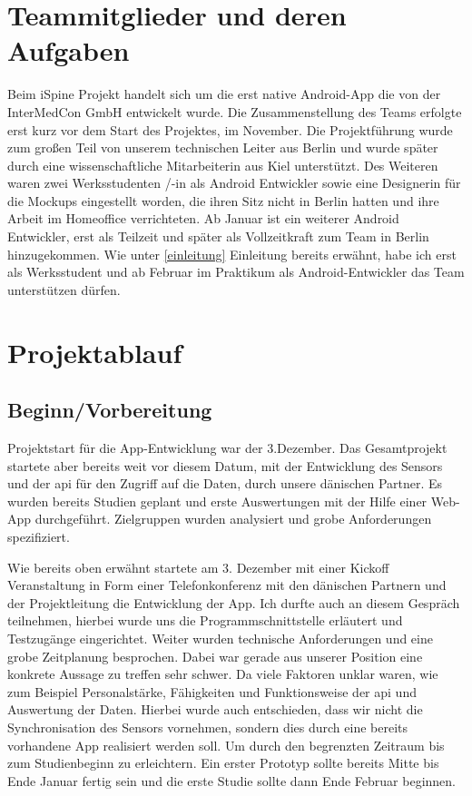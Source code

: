 \section{Teammitglieder und deren Aufgaben}\label{team}
Beim iSpine Projekt handelt sich um die erst native Android-App die von der InterMedCon GmbH entwickelt wurde. Die Zusammenstellung des Teams erfolgte erst kurz vor dem Start des Projektes, im November. Die Projektführung wurde zum großen Teil von unserem technischen Leiter aus Berlin und wurde später durch eine wissenschaftliche Mitarbeiterin aus Kiel unterstützt. Des Weiteren waren zwei Werksstudenten /-in als Android Entwickler sowie eine Designerin für die Mockups eingestellt worden, die ihren Sitz nicht in Berlin hatten und ihre Arbeit im Homeoffice verrichteten. Ab Januar ist ein weiterer Android Entwickler, erst als Teilzeit und später als Vollzeitkraft zum Team in Berlin hinzugekommen. Wie unter \ref*{einleitung} Einleitung bereits erwähnt, habe ich erst als Werksstudent und ab Februar im Praktikum als Android-Entwickler das Team unterstützen dürfen. 

\section{Projektablauf}
\subsection{Beginn/Vorbereitung}\label{kapBegin}
Projektstart für die App-Entwicklung  war der 3.Dezember. Das Gesamtprojekt startete aber bereits weit vor diesem Datum, mit der Entwicklung des Sensors und der \ac{api} für den Zugriff auf die Daten, durch unsere dänischen Partner. Es wurden bereits Studien geplant und erste Auswertungen mit der Hilfe einer Web-App durchgeführt. Zielgruppen wurden analysiert und grobe Anforderungen spezifiziert.

Wie bereits oben erwähnt startete am 3. Dezember mit einer Kickoff Veranstaltung in Form einer Telefonkonferenz mit den dänischen Partnern und der Projektleitung die Entwicklung der App. Ich durfte auch an diesem Gespräch teilnehmen, hierbei wurde uns die Programmschnittstelle erläutert und Testzugänge eingerichtet.
Weiter wurden technische Anforderungen  und eine grobe Zeitplanung besprochen. Dabei war gerade aus unserer Position eine konkrete Aussage zu treffen sehr schwer. Da viele Faktoren unklar waren, wie zum Beispiel Personalstärke, Fähigkeiten und Funktionsweise der \ac{api} und Auswertung der Daten.
Hierbei wurde auch entschieden, dass wir nicht die Synchronisation des Sensors vornehmen, sondern dies durch eine bereits vorhandene App realisiert werden soll. Um durch den begrenzten Zeitraum bis zum Studienbeginn zu erleichtern. Ein erster Prototyp sollte bereits Mitte bis Ende Januar fertig sein und die erste Studie sollte dann Ende Februar beginnen.

